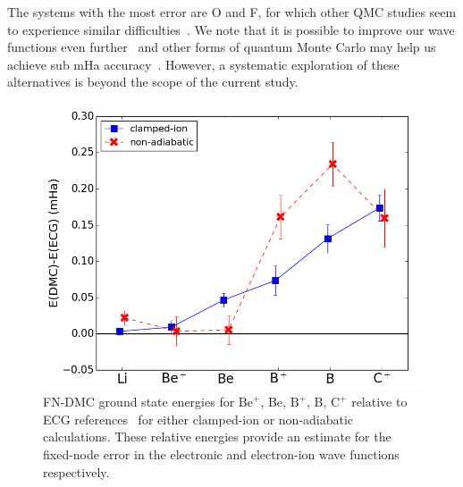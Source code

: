 \documentclass[pra,superscriptaddress,groupedaddress,twocolumn]{revtex4}
\begin{document}
The systems with the most error are O and F, for which other QMC studies seem to experience similar difficulties~\cite{Seth_Bench,Booth_FCIQMC,Brown_Bench}. We note that it is possible to improve our wave functions even further~\cite{Morale_Bench,Clay_Bench} and other forms of quantum Monte Carlo may help us achieve sub mHa accuracy~\cite{Tubman_Release,Tubman_ACS}. However, a systematic exploration of these alternatives is beyond the scope of the current study.

\begin{figure}[h]
\centering
\includegraphics[scale=.4]{Figures/atom-ECG}
\caption{FN-DMC ground state energies for $\text{Be}^+$, Be, $\text{B}^+$, B, $\text{C}^+$ relative to ECG references~\cite{Stanke_Be,Puchalski_Be+,Bubin_BeH_noBO,Bubin_B,Bubin_B+,Bubin_C+} for either clamped-ion or non-adiabatic calculations. These relative energies provide an estimate for the fixed-node error in the electronic and electron-ion wave functions respectively.\label{fig:atom-ECG}}
\end{figure}
\end{document}
